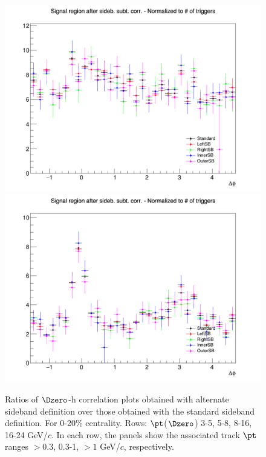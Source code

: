 \begin{figure}
{\includegraphics[width=0.31\linewidth]{figuresVsCent/Dzero/SystSideb/020/AzimCorrDistr_Dzero_Canvas_PtIntBins12to12_PoolInt_thr03to1_Superimp.png}}
{\includegraphics[width=0.31\linewidth]{figuresVsCent/Dzero/SystSideb/020/AzimCorrDistr_Dzero_Canvas_PtIntBins12to12_PoolInt_thr1to99_Superimp.png}} \\
 \caption{Ratios of $\Dzero$-h correlation plots obtained with alternate sideband definition over those obtained with the standard sideband definition. For 0-20\% centrality. Rows: $\pt$($\Dzero$) 3-5, 5-8, 8-16, 16-24 GeV/$c$. In each row, the panels show the associated track
$\pt$ ranges $> 0.3$, 0.3-1, $> 1$ GeV/$c$, respectively.}
\label{fig:SysBkg020}
\end{figure}


